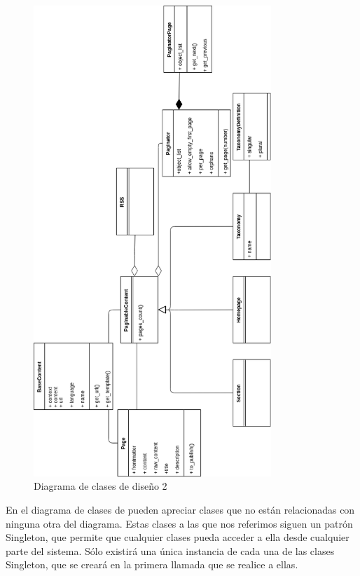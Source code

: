 \begin{figure}[htbp]
    \centering
    \includegraphics[width=0.8\textwidth]{5_diseno/clases_de_diseno2}
    \caption{Diagrama de clases de diseño 2}
    \label{fig:clases_diseno}
\end{figure}

En el diagrama de clases de pueden apreciar clases que no están relacionadas
con ninguna otra del diagrama. Estas clases a las que nos referimos siguen un patrón Singleton, que
permite que cualquier clases pueda acceder a ella desde cualquier parte del sistema. Sólo existirá una
única instancia de cada una de las clases Singleton, que se creará en la primera llamada que se realice a
ellas.


